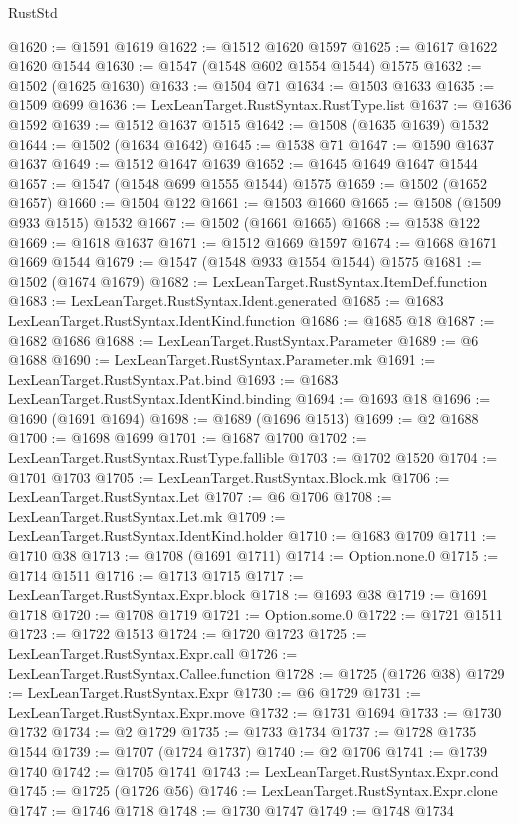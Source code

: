 \begin{lexlean}{RustStd}
\begin{coremodule}
@1620 := @1591 @1619
@1622 := @1512 @1620 @1597
@1625 := @1617 @1622 @1620 @1544
@1630 := @1547 (@1548 @602 @1554 @1544) @1575
@1632 := @1502 (@1625 @1630)
@1633 := @1504 @71
@1634 := @1503 @1633
@1635 := @1509 @699
@1636 := LexLeanTarget.RustSyntax.RustType.list
@1637 := @1636 @1592
@1639 := @1512 @1637 @1515
@1642 := @1508 (@1635 @1639) @1532
@1644 := @1502 (@1634 @1642)
@1645 := @1538 @71
@1647 := @1590 @1637 @1637
@1649 := @1512 @1647 @1639
@1652 := @1645 @1649 @1647 @1544
@1657 := @1547 (@1548 @699 @1555 @1544) @1575
@1659 := @1502 (@1652 @1657)
@1660 := @1504 @122
@1661 := @1503 @1660
@1665 := @1508 (@1509 @933 @1515) @1532
@1667 := @1502 (@1661 @1665)
@1668 := @1538 @122
@1669 := @1618 @1637
@1671 := @1512 @1669 @1597
@1674 := @1668 @1671 @1669 @1544
@1679 := @1547 (@1548 @933 @1554 @1544) @1575
@1681 := @1502 (@1674 @1679)
@1682 := LexLeanTarget.RustSyntax.ItemDef.function
@1683 := LexLeanTarget.RustSyntax.Ident.generated
@1685 := @1683 LexLeanTarget.RustSyntax.IdentKind.function
@1686 := @1685 @18
@1687 := @1682 @1686
@1688 := LexLeanTarget.RustSyntax.Parameter
@1689 := @6 @1688
@1690 := LexLeanTarget.RustSyntax.Parameter.mk
@1691 := LexLeanTarget.RustSyntax.Pat.bind
@1693 := @1683 LexLeanTarget.RustSyntax.IdentKind.binding
@1694 := @1693 @18
@1696 := @1690 (@1691 @1694)
@1698 := @1689 (@1696 @1513)
@1699 := @2 @1688
@1700 := @1698 @1699
@1701 := @1687 @1700
@1702 := LexLeanTarget.RustSyntax.RustType.fallible
@1703 := @1702 @1520
@1704 := @1701 @1703
@1705 := LexLeanTarget.RustSyntax.Block.mk
@1706 := LexLeanTarget.RustSyntax.Let
@1707 := @6 @1706
@1708 := LexLeanTarget.RustSyntax.Let.mk
@1709 := LexLeanTarget.RustSyntax.IdentKind.holder
@1710 := @1683 @1709
@1711 := @1710 @38
@1713 := @1708 (@1691 @1711)
@1714 := Option.none.{0}
@1715 := @1714 @1511
@1716 := @1713 @1715
@1717 := LexLeanTarget.RustSyntax.Expr.block
@1718 := @1693 @38
@1719 := @1691 @1718
@1720 := @1708 @1719
@1721 := Option.some.{0}
@1722 := @1721 @1511
@1723 := @1722 @1513
@1724 := @1720 @1723
@1725 := LexLeanTarget.RustSyntax.Expr.call
@1726 := LexLeanTarget.RustSyntax.Callee.function
@1728 := @1725 (@1726 @38)
@1729 := LexLeanTarget.RustSyntax.Expr
@1730 := @6 @1729
@1731 := LexLeanTarget.RustSyntax.Expr.move
@1732 := @1731 @1694
@1733 := @1730 @1732
@1734 := @2 @1729
@1735 := @1733 @1734
@1737 := @1728 @1735 @1544
@1739 := @1707 (@1724 @1737)
@1740 := @2 @1706
@1741 := @1739 @1740
@1742 := @1705 @1741
@1743 := LexLeanTarget.RustSyntax.Expr.cond
@1745 := @1725 (@1726 @56)
@1746 := LexLeanTarget.RustSyntax.Expr.clone
@1747 := @1746 @1718
@1748 := @1730 @1747
@1749 := @1748 @1734

\end{coremodule}
\end{lexlean}
